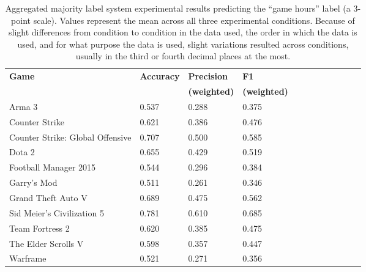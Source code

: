 \documentclass[9pt]{article}
\begin{document}
\begin{table*}[htbp]
\label{tab:majority}
\centering
\begin{tabular}{*{12}{l}}
\hline \bf Game & \bf Accuracy & \bf Precision & \bf F1 \\
& & \bf (weighted) & \bf (weighted) \\ \hline
Arma 3 & 0.537 & 0.288 & 0.375 \\
Counter Strike & 0.621 & 0.386 & 0.476 \\
Counter Strike: Global Offensive & 0.707 & 0.500 & 0.585 \\
Dota 2 & 0.655 & 0.429 & 0.519 \\
Football Manager 2015 & 0.544 & 0.296 & 0.384 \\
Garry's Mod & 0.511 & 0.261 & 0.346 \\
Grand Theft Auto V & 0.689 & 0.475 & 0.562 \\
Sid Meier's Civilization 5 & 0.781 & 0.610 & 0.685 \\
Team Fortress 2 & 0.620 & 0.385 & 0.475 \\
The Elder Scrolls V & 0.598 & 0.357 & 0.447 \\
Warframe & 0.521 & 0.271 & 0.356 \\ \hline
\end{tabular}
\caption{Aggregated majority label system experimental results predicting the ``game hours'' label (a 3-point scale). Values represent the mean across all three experimental conditions. Because of slight differences from condition to condition in the data used, the order in which the data is used, and for what purpose the data is used, slight variations resulted across conditions, usually in the third or fourth decimal places at the most.}
\end{table*}
\end{document}
